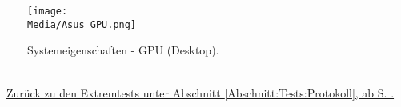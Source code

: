\begin{figure}[ht!]

	\centering
	\label{Anhang:Medien:Asus_GPU}
	
	\texttt{[image: \\Media/Asus\_GPU.png]}
	
	\caption{Systemeigenschaften - GPU (Desktop).}

\end{figure}

~\\~\mousecursor~\hyperref[Abschnitt:Tests:Protokoll:Extrem:Knoten_Erzeugen:Desktop]{Zurück zu den Extremtests unter Abschnitt \ref{Abschnitt:Tests:Protokoll}, ab S. \pageref{Abschnitt:Tests:Protokoll:Extrem:Knoten_Erzeugen:Desktop}.}


